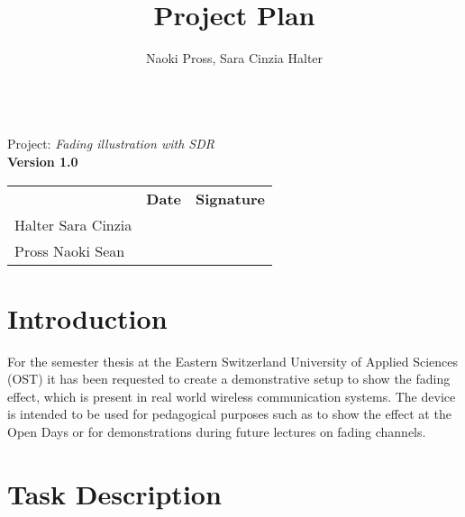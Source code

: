 \documentclass[a4paper, twosided, 11pt]{scrartcl}
\title{Project Plan}
\author{Naoki Pross, Sara Cinzia Halter}
\begin{document}
\begin{titlepage}
	\begin{flushright}
		\vspace{5cm}
		{\Huge \bfseries \thetitle} \\
		\vspace{5mm}
		{\LARGE Project: \textit{Fading illustration with SDR}} \\
		\vspace{5mm}
		{\LARGE \bfseries Version 1.0}
	\end{flushright}
\end{titlepage}

\clearpage
\clearpage
\tableofcontents

\vfill
{
	\renewcommand{\arraystretch}{2}
	\begin{tabularx}{\textwidth}{lp{}X}
		                   & \bfseries Date & \bfseries Signature\\
		Halter Sara Cinzia & \hrulefill & \hrulefill \\
		Pross Naoki Sean   & \hrulefill & \hrulefill \\
	\end{tabularx}
}
\clearpage

\section{Introduction}

For the semester thesis at the Eastern Switzerland University of Applied Sciences (OST) it has been requested to create a demonstrative setup to show the fading effect, which is present in real world wireless communication systems.
The device is intended to be used for pedagogical purposes such as to show the effect at the Open Days or for demonstrations during future lectures on fading channels.

\section{Task Description}
\end{document}
